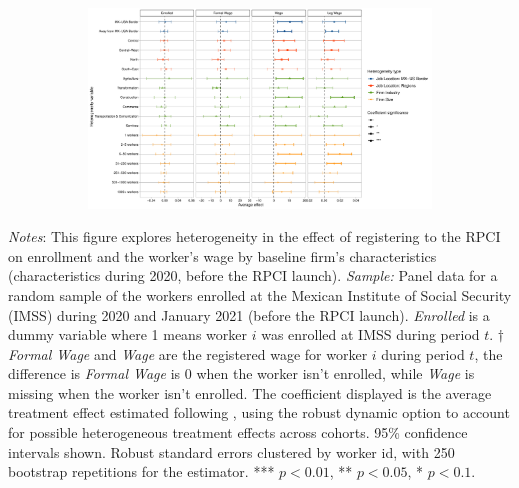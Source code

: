 \documentclass[10pt, oneside]{book}
\begin{document}
\begin{figure}[H]
    \centering
    \caption{Heterogeneity by firm characteristics \label{fig:heterogeneity_firm_rpci}}
    
    \begin{subfigure}{\textwidth}
    \includegraphics[width=\textwidth]{04_Figures/muestra_10porciento/dcdh_heterogeneity_firm_characteristics.pdf}
    \end{subfigure}
    
\end{figure}

\scriptsize{
\noindent \textit{Notes}: This figure explores heterogeneity in the effect of registering to the RPCI on enrollment and the worker's wage by baseline firm's characteristics (characteristics during 2020, before the RPCI launch). \textit{Sample:} Panel data for a random sample of the workers enrolled at the Mexican Institute of Social Security (IMSS) during 2020 and January 2021 (before the RPCI launch). \textit{Enrolled} is a dummy variable where 1 means worker $i$ was enrolled at IMSS during period $t$. $\dagger$ \textit{Formal Wage} and \textit{Wage} are the registered wage for worker $i$ during period $t$, the difference is \textit{Formal Wage} is 0 when the worker isn't enrolled, while \textit{Wage} is missing when the worker isn't enrolled. The coefficient displayed is the average treatment effect estimated following \cite{de2020two}, using the robust dynamic option to account for possible heterogeneous treatment effects across cohorts. 95\% confidence intervals shown. Robust standard errors clustered by worker id, with 250 bootstrap repetitions for the \cite{de2020two} estimator. *** $p<0.01$, ** $p<0.05$, * $p<0.1$. %
}
\end{document}
